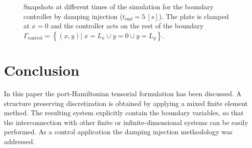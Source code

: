 \documentclass[letterpaper, 10 pt, conference]{ieeeconf}
\begin{document}
\begin{figure*}[t]
	\centering
		\hfil
		\hfil
	\caption{Snapshots at different times of the simulation for the boundary controller by damping injection ($t_{\text{end}} = 5 \,[s]$). The plate is clamped at $x = 0$ and the controller acts on the rest of the boundary $\Gamma_{\text{control}} = \left\{(x,y) \vert\; x=L_x \cup y=0 \cup y = L_y \right\}$.}
	\label{fig:SnapDamp}
	\hfil
\end{figure*}


\section{Conclusion}
In this paper the port-Hamiltonian tensorial formulation has been discussed. A structure preserving discretization is obtained by applying a mixed finite element method. The resulting system explicitly contain the boundary variables, so that the interconnection with other finite or infinite-dimensional systems can be easily performed. As a control application the damping injection methodology was addressed.



\end{document}
